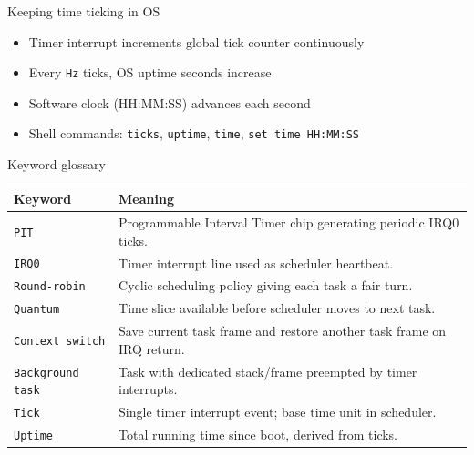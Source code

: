\documentclass[aspectratio=169]{beamer}
\begin{document}
\begin{frame}{Keeping time ticking in OS}
  \begin{itemize}
    \item Timer interrupt increments global tick counter continuously
    \item Every \texttt{Hz} ticks, OS uptime seconds increase
    \item Software clock (HH:MM:SS) advances each second
    \item Shell commands: \texttt{ticks}, \texttt{uptime}, \texttt{time}, \texttt{set time HH:MM:SS}
  \end{itemize}
\end{frame}

\begin{frame}{Keyword glossary}
  \small
  \begin{tabular}{@{}p{3.0cm}p{9.0cm}@{}}
    \toprule
    \textbf{Keyword} & \textbf{Meaning} \\
    \midrule
    \texttt{PIT} & Programmable Interval Timer chip generating periodic IRQ0 ticks. \\
    \texttt{IRQ0} & Timer interrupt line used as scheduler heartbeat. \\
    \texttt{Round-robin} & Cyclic scheduling policy giving each task a fair turn. \\
    \texttt{Quantum} & Time slice available before scheduler moves to next task. \\
    \texttt{Context switch} & Save current task frame and restore another task frame on IRQ return. \\
    \texttt{Background task} & Task with dedicated stack/frame preempted by timer interrupts. \\
    \texttt{Tick} & Single timer interrupt event; base time unit in scheduler. \\
    \texttt{Uptime} & Total running time since boot, derived from ticks. \\
    \bottomrule
  \end{tabular}
\end{frame}
\end{document}
